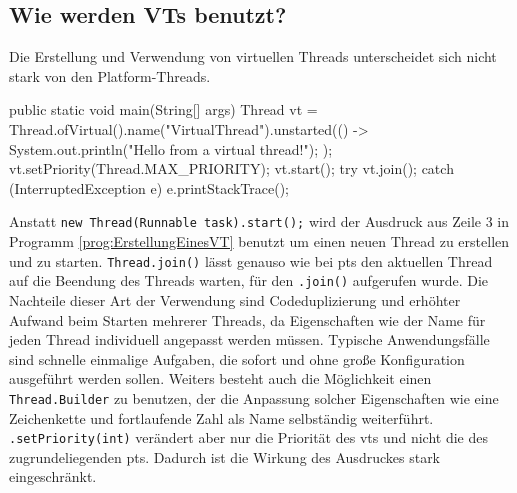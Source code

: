 \subsection{Wie werden VTs benutzt?}
\label{subsec:WieWerdenVTsBenutzt?}

    Die Erstellung und Verwendung von virtuellen Threads unterscheidet sich nicht stark von den Platform-Threads. 
    \begin{program} [H]
        \caption{Erstellung eines \Glspl{vt}}
        \label{prog:ErstellungEinesVT}
    \begin{JavaCode}[language=Java, numbers=left]
public static void main(String[] args) {
    Thread vt = Thread.ofVirtual().name("VirtualThread").unstarted(() -> {
        System.out.println("Hello from a virtual thread!");
    });
    vt.setPriority(Thread.MAX_PRIORITY);
    vt.start();
    try {
        vt.join();
    } catch (InterruptedException e) {
        e.printStackTrace();
    }
}\end{JavaCode}
    \end{program}
    Anstatt \texttt{new Thread(Runnable task).start();} wird der Ausdruck aus Zeile 3 in Programm 
    \ref{prog:ErstellungEinesVT} benutzt um einen neuen Thread zu erstellen und zu starten. \texttt{Thread.join()} lässt genauso wie bei \Glspl{pt} den aktuellen Thread 
    auf die Beendung des Threads warten, für den \texttt{.join()} aufgerufen wurde. Die Nachteile dieser Art der Verwendung sind Codeduplizierung und erhöhter Aufwand
    beim Starten mehrerer Threads, da Eigenschaften wie der Name für jeden Thread individuell angepasst werden müssen. Typische Anwendungsfälle sind schnelle
    einmalige Aufgaben, die sofort und ohne große Konfiguration ausgeführt werden sollen.
    Weiters besteht auch die Möglichkeit einen \texttt{Thread.Builder} zu benutzen, der die Anpassung solcher Eigenschaften wie eine Zeichenkette und fortlaufende Zahl
    als Name selbständig weiterführt.
    \texttt{.setPriority(int)} verändert aber nur die Priorität des \Glspl{vt} und nicht die des zugrundeliegenden \Glspl{pt}. Dadurch ist die Wirkung des Ausdruckes
    stark eingeschränkt.
    
